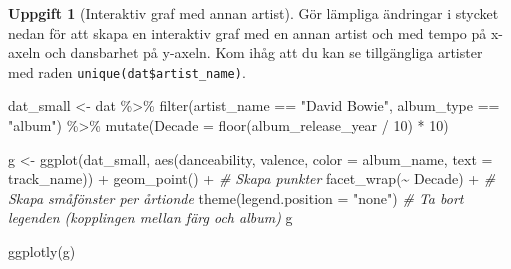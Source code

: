 \documentclass[
]{book}
\newenvironment{Shaded}{\begin{snugshade}}{\end{snugshade}}
\newcommand{\AttributeTok}[1]{\textcolor[rgb]{0.77,0.63,0.00}{#1}}
\newcommand{\CommentTok}[1]{\textcolor[rgb]{0.56,0.35,0.01}{\textit{#1}}}
\newcommand{\DecValTok}[1]{\textcolor[rgb]{0.00,0.00,0.81}{#1}}
\newcommand{\FunctionTok}[1]{\textcolor[rgb]{0.00,0.00,0.00}{#1}}
\newcommand{\NormalTok}[1]{#1}
\newcommand{\OtherTok}[1]{\textcolor[rgb]{0.56,0.35,0.01}{#1}}
\newcommand{\SpecialCharTok}[1]{\textcolor[rgb]{0.00,0.00,0.00}{#1}}
\newcommand{\StringTok}[1]{\textcolor[rgb]{0.31,0.60,0.02}{#1}}
\theoremstyle{definition}
\theoremstyle{definition}
\theoremstyle{definition}
\newtheorem{exercise}{Uppgift}[chapter]
\theoremstyle{definition}
\theoremstyle{remark}
\begin{document}
\begin{exercise}[Interaktiv graf med annan artist]

Gör lämpliga ändringar i stycket nedan för att skapa en interaktiv graf med en annan artist och med tempo på x-axeln och dansbarhet på y-axeln. Kom ihåg att du kan se tillgängliga artister med raden \texttt{unique(dat\$artist\_name)}.

\begin{Shaded}
\begin{Highlighting}[]
\NormalTok{dat\_small }\OtherTok{\textless{}{-}}\NormalTok{ dat }\SpecialCharTok{\%\textgreater{}\%} 
  \FunctionTok{filter}\NormalTok{(artist\_name }\SpecialCharTok{==} \StringTok{"David Bowie"}\NormalTok{, album\_type }\SpecialCharTok{==} \StringTok{"album"}\NormalTok{) }\SpecialCharTok{\%\textgreater{}\%} 
  \FunctionTok{mutate}\NormalTok{(}\AttributeTok{Decade =} \FunctionTok{floor}\NormalTok{(album\_release\_year }\SpecialCharTok{/} \DecValTok{10}\NormalTok{) }\SpecialCharTok{*} \DecValTok{10}\NormalTok{)}

\NormalTok{g }\OtherTok{\textless{}{-}} \FunctionTok{ggplot}\NormalTok{(dat\_small, }\FunctionTok{aes}\NormalTok{(danceability, valence, }\AttributeTok{color =}\NormalTok{ album\_name, }\AttributeTok{text =}\NormalTok{ track\_name)) }\SpecialCharTok{+}
  \FunctionTok{geom\_point}\NormalTok{() }\SpecialCharTok{+}                                 \CommentTok{\# Skapa punkter}
  \FunctionTok{facet\_wrap}\NormalTok{(}\SpecialCharTok{\textasciitilde{}}\NormalTok{ Decade) }\SpecialCharTok{+}                         \CommentTok{\# Skapa småfönster per årtionde}
  \FunctionTok{theme}\NormalTok{(}\AttributeTok{legend.position =} \StringTok{"none"}\NormalTok{)                }\CommentTok{\# Ta bort legenden (kopplingen mellan färg och album)}
\NormalTok{g}

\FunctionTok{ggplotly}\NormalTok{(g)}
\end{Highlighting}
\end{Shaded}

\end{exercise}
\end{document}
